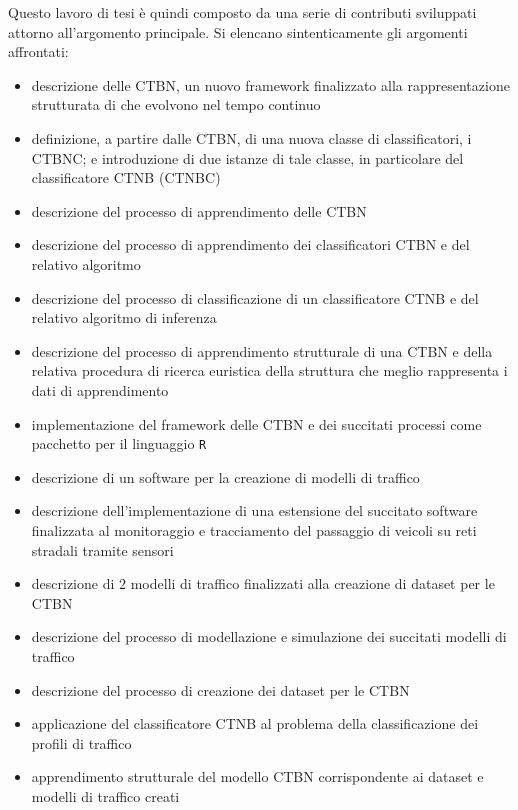 Questo lavoro di tesi è quindi composto da una serie di contributi sviluppati attorno all'argomento principale. Si elencano sintenticamente gli argomenti affrontati:
\begin{itemize}
	\item descrizione delle \acl{CTBN}, un nuovo framework finalizzato alla rappresentazione strutturata di \mprocess{} che evolvono nel tempo continuo
	\item definizione, a partire dalle \acl{CTBN}, di una nuova classe di classificatori, i \acf{CTBNC}; e introduzione di due istanze di tale classe, in particolare del classificatore \acl{CTNB} (\acs{CTNBC})
	\item descrizione del processo di apprendimento delle \acl{CTBN}
	\item descrizione del processo di apprendimento dei classificatori \acl{CTBN} e del relativo algoritmo
	\item descrizione del processo di classificazione di un classificatore \acl{CTNB} e del relativo algoritmo di inferenza
	\item descrizione del processo di apprendimento strutturale di una \acl{CTBN} e della relativa procedura di ricerca euristica della struttura che meglio rappresenta i dati di apprendimento
	\item implementazione del framework delle \acl{CTBN} e dei succitati processi come pacchetto per il linguaggio \lstinline[]|R|
	\item descrizione di un software per la creazione di modelli di traffico
	\item descrizione dell'implementazione di una estensione del succitato software finalizzata al monitoraggio e tracciamento del passaggio di veicoli su reti stradali tramite sensori
	\item descrizione di $2$ modelli di traffico finalizzati alla creazione di dataset per le \acl{CTBN}
	\item descrizione del processo di modellazione e simulazione dei succitati modelli di traffico
	\item descrizione del processo di creazione dei dataset per le \acl{CTBN}
	\item applicazione del classificatore \acl{CTNB} al problema della classificazione dei profili di traffico
	\item apprendimento strutturale del modello \acl{CTBN} corrispondente ai dataset e modelli di traffico creati
\end{itemize}

